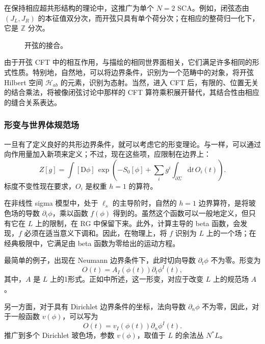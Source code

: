 在保持相应超共形结构的理论中，这推广为单个 $N=2$ SCA。例如，闭弦态由 $(J_L,J_R)$ 的本征值双分次，而开弦只具有单个荷分次；在相应的整荷归一化下，它是 $\mathbb{Z}$ 分次。
\begin{figure}[H]
\centering
{}
\caption{开弦的接合。}\label{fig:3.6}
\end{figure}

由于开弦 CFT 中的相互作用，与描绘的相同世界面相关，它们满足许多相同的形式性质。特别地，自然地，可以将边界条件，识别为一个范畴中的对象，将开弦 Hilbert 空间 $\mathcal{H}_{ab}$ 的元素，识别为态射。当然，进入 CFT 后，有限的、位置无关的结合乘法，将被像闭弦讨论中那样的 CFT 算符乘积展开替代，其结合性由相应的缝合关系表达。

\subsubsection{形变与世界体规范场}\label{sec:3.5.2.6}

一旦有了定义良好的共形边界条件，就可以考虑它的形变理论。与一样，可以通过向作用量加入新项来定义；不过，现在这些项，应限制在边界上：
\begin{equation}\label{eq:3.143}
Z[g]=\int[\mathrm{D}\phi]\,
\exp\left(-S_0[\phi]+\sum_i g^i\int_{\partial\Sigma}\mathrm{d}t\,O_i(t)\right).
\end{equation}
标度不变性现在要求，$O_i$ 是权重 $h=1$ 的算符。

在非线性 sigma 模型中，处于 $\ell_s$ 的主导阶时，自然的 $h=1$ 边界算符，是将玻色场的导数 $\partial_i\phi$，乘以函数 $f(\phi)$ 得到的。虽然这个函数可以一般地定义，但只有它在 $L$ 上的限制，在 RG 中保留下来。此外，计算主导的 beta 函数，会发现，$f$ 必须在适当意义下调和。因此，在物理上，将 $f$ 识别为 $L$ 上的一个场；在经典极限中，它满足由 beta 函数为零给出的运动方程。

最简单的例子，出现在 Neumann 边界条件下，此时切向导数 $\partial_t\phi$ 不为零。形变为
\begin{equation}\label{eq:3.144}
O(t)=A_I(\phi(t))\partial_t\phi^I(t),
\end{equation}
其中，$A$ 是 $L$ 上的1形式。正如中所述，这一形变，对应于改变 $L$ 上的规范场 $A$。

另一方面，对于具有 Dirichlet 边界条件的坐标，法向导数 $\partial_n\phi$ 不为零，因此，对于一般函数 $v(\phi)$，可以写为
\begin{equation}\label{eq:3.145}
O(t)=v_I(\phi(t))\partial_n\phi^I(t).
\end{equation}
推广到多个 Dirichlet 玻色场，参数 $v(\phi)$，取值于 $L$ 的余法丛 $N^*L$。

